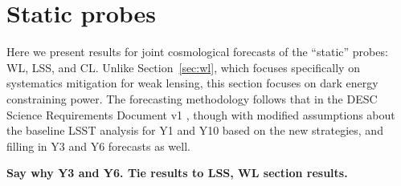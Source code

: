 \section{Static probes}

\newcommand{\todorm}[1]{\textbf{#1}}

Here we present results for joint cosmological forecasts of the ``static'' probes: WL, LSS, and CL.
Unlike Section~\ref{sec:wl}, which focuses specifically on systematics mitigation for weak lensing,
this section focuses on dark energy constraining power.  The forecasting methodology follows
that in the DESC Science Requirements Document v1 \citep{DESCSRD2018}, though with modified
assumptions about the baseline LSST analysis for Y1 and Y10 based on the new strategies, and filling
in Y3 and Y6 forecasts as well.

\todorm{Say why Y3 and Y6.  Tie results to LSS, WL section results.}

